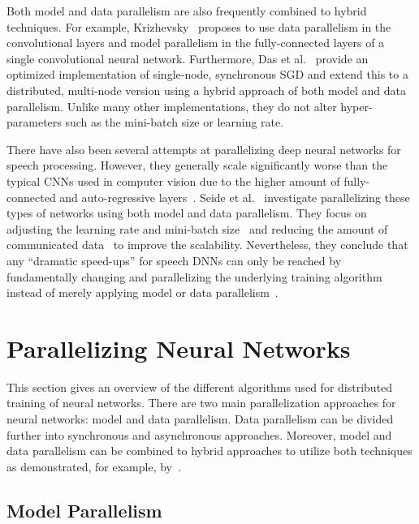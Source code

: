 \documentclass[conference]{IEEEtran}
\begin{document}
Both model and data parallelism are also frequently combined to hybrid techniques.
For example, Krizhevsky~\cite{krizhevsky2014-One-weird-trick} proposes to use data parallelism in the convolutional layers and model parallelism in the fully-connected layers of a single convolutional neural network.
%
Furthermore, Das et al.~\cite{das2016-Distributed-deep-learning} provide an optimized implementation of single-node, synchronous SGD and extend this to a distributed, multi-node version using a hybrid approach of both model and data parallelism.
Unlike many other implementations, they do not alter hyper-parameters such as the mini-batch size or learning rate.

There have also been several attempts at parallelizing deep neural networks for speech processing.
However, they generally scale significantly worse than the typical CNNs used in computer vision due to the higher amount of fully-connected and auto-regressive layers~\cite{dean2012-Large-scale-distributed,seide2014-Speech-DNNs}.
Seide et al.~\cite{seide2014-Speech-DNNs,seide2014-1-bit-stochastic} investigate parallelizing these types of networks using both model and data parallelism.
They focus on adjusting the learning rate and mini-batch size~\cite{seide2014-Speech-DNNs} and reducing the amount of communicated data~\cite{seide2014-1-bit-stochastic} to improve the scalability.
Nevertheless, they conclude that any ``dramatic speed-ups'' for speech DNNs can only be reached by fundamentally changing and parallelizing the underlying training algorithm instead of merely applying model or data parallelism~\cite{seide2014-Speech-DNNs,seide2014-1-bit-stochastic}.


\section{Parallelizing Neural Networks} %
\label{sec:parallelizing_neural_networks}
This section gives an overview of the different algorithms used for distributed training of neural networks.
There are two main parallelization approaches for neural networks: model and data parallelism.
Data parallelism can be divided further into synchronous and asynchronous approaches.
Moreover, model and data parallelism can be combined to hybrid approaches to utilize both techniques as demonstrated, for example, by~\cite{krizhevsky2014-One-weird-trick,das2016-Distributed-deep-learning}.

\subsection{Model Parallelism} %
\label{sub:model_parallelism}
\end{document}
